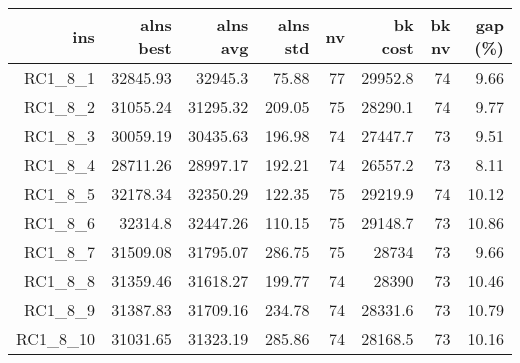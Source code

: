   \begin{table}[caption={Kết quả đo với tập HG\_RC\_1\_8 800 yêu cầu}, label=exp:HGRC18]
    \centering
    \begin{tabular}{rrrrrrrr}
    \hline
    ins & alns best & alns avg & alns std & nv & bk cost & bk nv & gap (\%) \\ \hline
    RC1\_8\_1 & 32845.93 & 32945.3 & 75.88 & 77 & 29952.8 & 74 & 9.66 \\ \hline
    RC1\_8\_2 & 31055.24 & 31295.32 & 209.05 & 75 & 28290.1 & 74 & 9.77 \\ \hline
    RC1\_8\_3 & 30059.19 & 30435.63 & 196.98 & 74 & 27447.7 & 73 & 9.51 \\ \hline
    RC1\_8\_4 & 28711.26 & 28997.17 & 192.21 & 74 & 26557.2 & 73 & 8.11 \\ \hline
    RC1\_8\_5 & 32178.34 & 32350.29 & 122.35 & 75 & 29219.9 & 74 & 10.12 \\ \hline
    RC1\_8\_6 & 32314.8 & 32447.26 & 110.15 & 75 & 29148.7 & 73 & 10.86 \\ \hline
    RC1\_8\_7 & 31509.08 & 31795.07 & 286.75 & 75 & 28734 & 73 & 9.66 \\ \hline
    RC1\_8\_8 & 31359.46 & 31618.27 & 199.77 & 74 & 28390 & 73 & 10.46 \\ \hline
    RC1\_8\_9 & 31387.83 & 31709.16 & 234.78 & 74 & 28331.6 & 73 & 10.79 \\ \hline
    RC1\_8\_10 & 31031.65 & 31323.19 & 285.86 & 74 & 28168.5 & 73 & 10.16 \\ \hline
    \end{tabular}
  \end{table}

